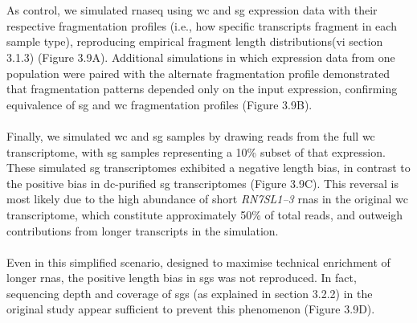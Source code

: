 \\
\\
As control, we simulated \gls{rnaseq} using \gls{wc} and \gls{sg} expression data with their respective fragmentation profiles (i.e., how specific transcripts fragment in each sample type), reproducing empirical fragment length distributions(\gls{vi} section 3.1.3\cite{khong_stress_2017}) (Figure 3.9A). Additional simulations in which expression data from one population were paired with the alternate fragmentation profile demonstrated that fragmentation patterns depended only on the input expression, confirming equivalence of \gls{sg} and \gls{wc} fragmentation profiles (Figure 3.9B).
\\
\\
Finally, we simulated \gls{wc} and \gls{sg} samples by drawing reads from the full \gls{wc} transcriptome, with \gls{sg} samples representing a 10\% subset of that expression. These simulated \gls{sg} transcriptomes exhibited a negative length bias, in contrast to the positive bias in \gls{dc}-purified \gls{sg} transcriptomes (Figure 3.9C). This reversal is most likely due to the high abundance of short\textit{ RN7SL1–3} \glspl{rna} in the original \gls{wc} transcriptome, which constitute approximately 50\% of total reads\cite{khong_stress_2017}, and outweigh contributions from longer transcripts in the simulation.
\\
\\
Even in this simplified scenario, designed to maximise technical enrichment of longer \glspl{rna}, the positive length bias in \glspl{sg} was not reproduced. In fact, sequencing depth and coverage of \glspl{sg} (as explained in section 3.2.2) in the original study\cite{khong_stress_2017} appear sufficient to prevent this phenomenon (Figure 3.9D).
\\
